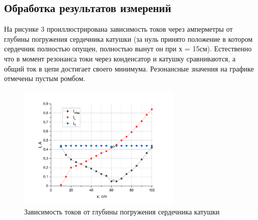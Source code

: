 \documentclass[a4paper, 12pt]{article}
\begin{document}
\newpage
\subsection{Обработка результатов измерений}
На рисунке 3 проиллюстрирована зависимость токов через амперметры от глубины погружения сердечника катушки (за нуль принято положение в котором сердечник полностью опущен, полностью вынут он при х = 15см). Естественно что в момент резонанса  токи через конденсатор и катушку сравниваются, а общий ток в цепи достигает своего минимума. Резонансные значения на графике отмечены пустым ромбом.

 \begin{figure}[h!]
\begin{center}
\includegraphics[width=0.7\textwidth]{Graph2.png}
\end{center}
\caption{Зависимость токов от глубины погружения сердечника катушки}
\end{figure}
\end{document}
